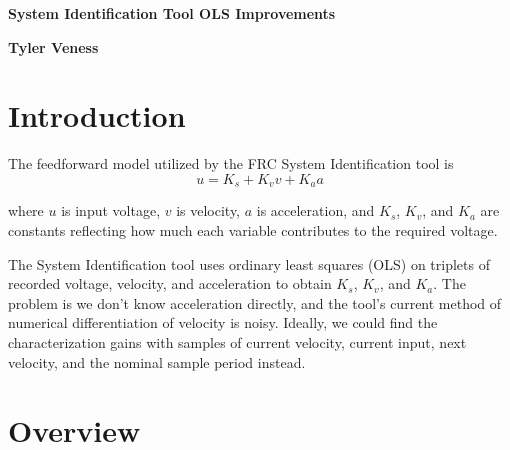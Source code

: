 \documentclass[10pt,conference,compsoc]{IEEEtran}
\begin{document}
\begin{titlepage}
  \begin{center}
    \vspace*{1cm}

    \Huge
    \textbf{System Identification Tool OLS Improvements}

    \vspace{1.5cm}

    \textbf{Tyler Veness}

    \vfill

    \vspace{0.8cm}
  \end{center}

  \vfill

  \vspace{0.8cm}
\end{titlepage}
\thispagestyle{empty}  %

\renewcommand\contentsname{Table of Contents}
\tableofcontents
\thispagestyle{empty}  %
\clearpage


\section{Introduction}

The feedforward model utilized by the FRC System Identification tool is
\begin{equation}
  u = K_s + K_v v + K_a a \label{eq:u_ff}
\end{equation}

where $u$ is input voltage, $v$ is velocity, $a$ is acceleration, and $K_s$,
$K_v$, and $K_a$ are constants reflecting how much each variable contributes to
the required voltage.

The System Identification tool uses ordinary least squares (OLS) on triplets of
recorded voltage, velocity, and acceleration to obtain $K_s$, $K_v$, and $K_a$.
The problem is we don't know acceleration directly, and the tool's current
method of numerical differentiation of velocity is noisy. Ideally, we could find
the characterization gains with samples of current velocity, current input, next
velocity, and the nominal sample period instead.

\section{Overview}
\end{document}
